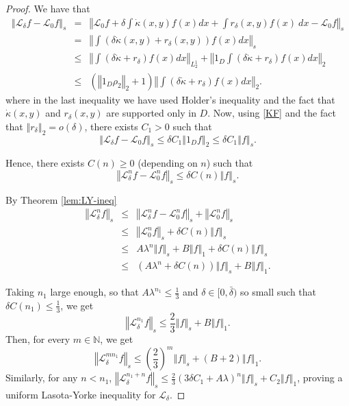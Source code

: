 \documentclass[10pt,a4paper]{amsart}
\newcommand\bN{{\mathbb N}}
\newcommand\cL{{\mathcal L}}
\newcommand{\norm}[1]{\left\Vert#1\right\Vert}
\begin{document}
\begin{proof}
We have that 
\begin{eqnarray*}
\norm{\cL_{\delta }f-\cL_{0}f}_{s} &= &\norm{\cL_{0}f+\delta
\int \dot{\kappa}(x,y)f(x)dx+\int {r_{\delta }(x,y)}f(x)\
dx-\cL_{0}f}_{s} \\
&= &\norm{\int (\delta \dot{\kappa}(x,y)+r_{\delta }(x,y))f(x)dx}_{s} \\
& \leq &\norm{\int \left( \delta \dot{\kappa}+ r_\delta \right) f(x) dx}_{L^1_2} + {\norm{1_D\int ( \delta \dot{\kappa}+ r_\delta ) f(x) dx}_{2}}\\
&\leq  &(\norm{1_D\rho_2}_2+1)\norm{\int(\delta \dot{\kappa}+ r_\delta)f(x)dx}_2.
\end{eqnarray*}%
 where in the last inequality we have used Holder's inequality and the fact that $\dot{\kappa}(x,y)$ and $ {r_{\delta }(x,y)}$ are supported only in $D$. Now, using \eqref{KF} and the fact that \(\norm{r_\delta}_2=o(\delta)\), there exists \( C_1>0\) such that
\begin{equation}\label{eq:diff_1}
    \norm{\cL_{\delta }f-\cL_{0}f}_{s} \leq \delta
C_{1}\norm{1_{D}f}_{{2}} \leq \delta C_{1}\norm{f}_{s}.
\end{equation}

Hence, there exists $C(n)\geq 0$ (depending on $n$) such that%
\begin{equation*}
\norm{\cL_{\delta }^{n}f-\cL_{0}^{n}f}_{s}\leq \delta
C(n)\norm{f}_{s}.
\end{equation*}

By Theorem \ref{lem:LY-ineq}
\begin{eqnarray*}
\norm{\cL_{\delta }^{n}f}_{s} &\leq&\norm{\cL_{\delta }^{n}f-\cL_0^n f}_{s}+\norm{\cL_{0 }^{n}f}_{s}\\
&\leq&\norm{\cL_{0}^{n}f}_{s}+\delta C(n)\norm{f}_{s} \\
&\leq &A\lambda ^{n}\norm{f}_{s}+B\norm{f}_{{1}}+\delta C(n)\norm{f}_{s}\\
&\leq &(A\lambda ^{n}+\delta C(n))\norm{f}_{s}+B\norm{f}_{{1}}.
\end{eqnarray*}%

Taking $n_{1}$ large enough, so that $A\lambda ^{n_{1}}\leq\frac{1}{3}$ and $\delta\in [0,\bar\delta)$ so small such that  $\delta C(n_1)\leq\frac{1}{3}$, we get 
\begin{equation*}
\norm{\cL_{\delta}^{n_{1}}f}_{s}\leq
\frac23\norm{f}_{s}+B\norm{f}_{{1}}.
\end{equation*}
Then, for every \(m\in \bN\), we get 
\[\norm{ \cL_{\delta }^{mn_{1}}f}_{s}\leq \left(\frac 23\right)^m\norm{
f}_{s}+(B+2)\norm{f}_{{1}}.\]
Similarly, for any \(n<n_1\), \(\norm{\cL^{n_1+n}_\delta f}_s\leq \frac{2}{3}(3\delta C_1+A\lambda)^n\norm{f}_s + C_2\norm{f}_{1}\), proving a uniform Lasota-Yorke inequality for $\cL_{\delta }.$
\end{proof}
\end{document}
